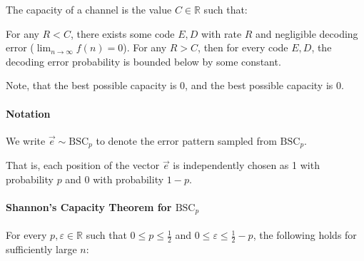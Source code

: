 \documentclass{idc_msc}
\begin{document}
The capacity of a channel is the value \(C \in \mathbb{R}\) such that:

For any \(R < C\), there exists some code \(E, D\) with rate \(R\) and negligible decoding error (\(\lim_{n \to \infty} f(n) = 0\)).
For any \(R > C\), then for every code \(E, D\), the decoding error probability is bounded below by some constant.

Note, that the best possible capacity is 0, and the best possible capacity is 0.

\paragraph{Notation}

We write \(\vec{e} \sim \text{BSC}_p\) to denote the error pattern sampled from \(\text{BSC}_p\).

That is, each position of the vector \(\vec{e}\) is independently chosen as 1 with probability \(p\) and 0 with probability \(1-p\).

\paragraph{Shannon's Capacity Theorem for \(\text{BSC}_p\)}

For every \(p, \varepsilon \in \mathbb{R}\) such that \(0 \le p \le \frac{1}{2}\) and \(0 \le \varepsilon \le \frac{1}{2} - p\), the following holds for sufficiently large \(n\):
\end{document}
